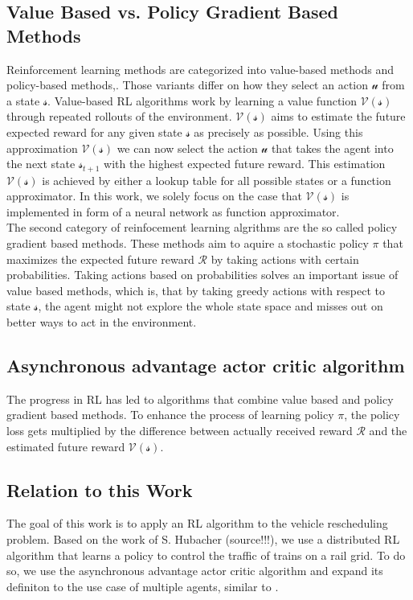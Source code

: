 \subsection*{Value Based vs. Policy Gradient Based Methods}\label{value_policy_based_methods}
Reinforcement learning methods are categorized into value-based methods and policy-based methods\cite{tdlearning},\cite{policygradient}. Those variants differ on how they select an action $\mathcal{u}$ from a state $\mathcal{s}$.
Value-based RL algorithms work by learning a value function $\mathcal{V(s)}$ through repeated rollouts of the environment. $\mathcal{V(s)}$ aims to estimate the future expected reward for any given state $\mathcal{s}$ as precisely as possible. Using this approximation $\mathcal{V(s)}$ we can now select the action $\mathcal{u}$ that takes the agent into the next state $\mathcal{s}_{t+1}$ with the highest expected future reward. This estimation $\mathcal{V(s)}$ is achieved by either a lookup table for all possible states or a function approximator. In this work, we solely focus on the case that $\mathcal{V(s)}$ is implemented in form of a neural network as function approximator.\\
The second category of reinfocement learning algrithms are the so called policy gradient based methods. These methods aim to aquire a stochastic policy $\pi$ that maximizes the expected future reward $\mathcal{R}$ by taking actions with certain probabilities. Taking actions based on probabilities solves an important issue of value based methods, which is, that by taking greedy actions with respect to state  $\mathcal{s}$, the agent might not explore the whole state space and misses out on better ways to act in the environment.


\subsection*{Asynchronous advantage actor critic algorithm}\label{a3c_intro}
The progress in RL has led to algorithms that combine value based and policy gradient based methods. To enhance the process of learning policy $\pi$, the policy loss gets multiplied by the difference between actually received reward $\mathcal{R}$ and the estimated future reward $\mathcal{V(s)}$. 


\subsection*{Relation to this Work}\label{rl_relation_work}
The goal of this work is to apply an RL algorithm to the vehicle rescheduling problem. Based on the work of S. Hubacher (source!!!), we use a distributed RL algorithm that learns a policy to control the traffic of trains on a rail grid. To do so, we use the asynchronous advantage actor critic algorithm \cite{a3c} and expand its definiton to the use case of multiple agents, similar to \cite{marltraffica3c}.

